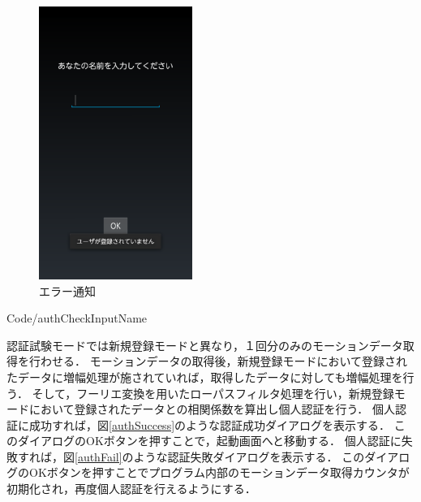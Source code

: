 \documentclass[11pt]{jreport}
\renewcommand{\slash}{/}
\begin{document}
\begin{figure}[htbp]
            \begin{minipage}{0.33\hsize}
                \begin{center}
                    \includegraphics[width=5cm, bb=0 0 540 960]{AuthNameInputError.pdf}
                \end{center}
                \caption{エラー通知}
                \label{authNameInputError}
            \end{minipage}
        \end{figure}

        \newpage
        
        {Code\slash authCheckInputName}

        認証試験モードでは新規登録モードと異なり，１回分のみのモーションデータ取得を行わせる．
        モーションデータの取得後，新規登録モードにおいて登録されたデータに増幅処理が施されていれば，取得したデータに対しても増幅処理を行う．
        そして，フーリエ変換を用いたローパスフィルタ処理を行い，新規登録モードにおいて登録されたデータとの相関係数を算出し個人認証を行う．
        個人認証に成功すれば，図\ref{authSuccess}のような認証成功ダイアログを表示する．
        このダイアログのOKボタンを押すことで，起動画面へと移動する．
        個人認証に失敗すれば，図\ref{authFail}のような認証失敗ダイアログを表示する．
        このダイアログのOKボタンを押すことでプログラム内部のモーションデータ取得カウンタが初期化され，再度個人認証を行えるようにする．
\end{document}
